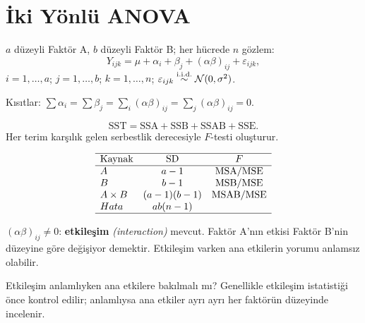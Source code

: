 \section{İki Yönlü ANOVA}
\label{sec:iki_anova}

\begin{tanim}\label{def:iki_anova}
$a$ düzeyli Faktör A, $b$ düzeyli Faktör B; her hücrede $n$ gözlem:
\[
  Y_{ijk} = \mu + \alpha_i + \beta_j + (\alpha\beta)_{ij} + \varepsilon_{ijk},
\]
$i=1,\ldots,a$; $j=1,\ldots,b$; $k=1,\ldots,n$; $\varepsilon_{ijk}\overset{\text{i.i.d.}}{\sim}\mathcal{N}(0,\sigma^2)$.

Kısıtlar: $\sum\alpha_i=\sum\beta_j=\sum_i(\alpha\beta)_{ij}=\sum_j(\alpha\beta)_{ij}=0$.
\end{tanim}

\begin{teorem}\label{thm:iki_sst}
\[
  \mathrm{SST} = \mathrm{SSA} + \mathrm{SSB} + \mathrm{SSAB} + \mathrm{SSE}.
\]
Her terim karşılık gelen serbestlik derecesiyle $F$-testi oluşturur.
\end{teorem}

\begin{ornek}\label{ex:iki_anova_tablo}
\[
\begin{array}{lccc}
\hline
\text{Kaynak} & \text{SD} & F \\
\hline
A & a-1 & \mathrm{MSA}/\mathrm{MSE} \\
B & b-1 & \mathrm{MSB}/\mathrm{MSE} \\
A\times B & (a-1)(b-1) & \mathrm{MSAB}/\mathrm{MSE} \\
Hata & ab(n-1) & \\
\hline
\end{array}
\]
\end{ornek}

\begin{tanim}[Etkileşim]\label{def:etkilesim}
$(\alpha\beta)_{ij}\neq0$: \textbf{etkileşim} \emph{(interaction)} mevcut. Faktör A'nın etkisi Faktör B'nin düzeyine göre değişiyor demektir. Etkileşim varken ana etkilerin yorumu anlamsız olabilir.
\end{tanim}

\begin{kritiksorgu}
Etkileşim anlamlıyken ana etkilere bakılmalı mı? Genellikle etkileşim istatistiği önce kontrol edilir; anlamlıysa ana etkiler ayrı ayrı her faktörün düzeyinde incelenir.
\end{kritiksorgu}

